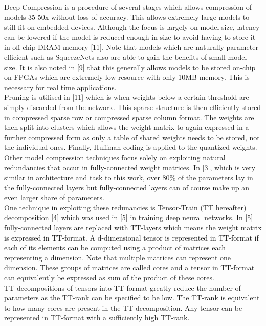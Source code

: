 \documentclass{article}
\begin{document}
Deep Compression is a procedure of several stages which allows compression of models 35-50x without loss of accuracy. This allows extremely large models to still fit on embedded devices. Although the focus is largely on model size, latency can be lowered if the model is reduced enough in size to avoid having to store it in off-chip DRAM memory [11]. Note that models which are naturally parameter efficient such as SqueezeNets also are able to gain the benefits of small model size. It is also noted in [9] that this generally allows models to be stored on-chip on FPGAs which are extremely low resource with only 10MB  memory. This is necessary for real time applications. \\

Pruning is utilised in [11] which is when weights below a certain threshold are simply discarded from the network. This sparse structure is then efficiently stored in compressed sparse row or compressed sparse column format. The weights are then split into clusters which allows the weight matrix to again expressed in a further compressed form as only a table of shared weights needs to be stored, not the individual ones. Finally, Huffman coding is applied to the quantized weights.\\

Other model compression techniques focus solely on exploiting natural redundancies that occur in fully-connected weight matrices. In [3], which is very similar in architecture and task to this work, over 80\% of the parameters lay in the fully-connected layers but fully-connected layers can of course make up an even larger share of parameters.\\

One technique in exploiting these redunancies is Tensor-Train (TT hereafter) decomposition [4] which was used in [5] in training deep neural networks. In [5] fully-connected layers are replaced with TT-layers which means the weight matrix is expressed in TT-format. A d-dimensional tensor is represented in TT-format if each of its elements can be computed using a product of matrices each representing a dimension. Note that multiple matrices can represent one dimension. These groups of matrices are called cores and a tensor in TT-format can equivalently be expressed as sum of the product of these cores. \\

TT-decompositions of tensors into TT-format greatly reduce the number of parameters as the TT-rank can be specified to be low. The TT-rank is equivalent to how many cores are present in the TT-decomposition. Any tensor can be represented in TT-format with a sufficiently high TT-rank.\\
\end{document}
